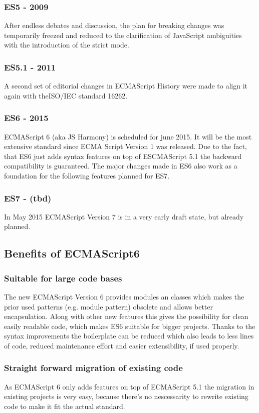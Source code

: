 \documentclass{bioinfo}
\begin{document}
\subsubsection*{\textbf{ES5 - 2009}}
After endless debates and discussion, the plan for breaking changes was temporarily freezed and reduced to the clarification of JavaScript ambiguities with the introduction of the strict mode.
\subsubsection*{\textbf{ES5.1 - 2011}}
A second set of editorial changes in ECMAScript History were made to align it again with theISO/IEC standard 16262.
\subsubsection*{\textbf{ES6 - 2015}}
ECMAScript 6 (aka JS Harmony) is scheduled for june 2015. It will be the most extensive standard since ECMA Script Version 1 was released. Due to the fact, that ES6 just adds syntax features on top of ESCMAScript 5.1 the backward compatibility is guaranteed. The major changes made in ES6 also work as a foundation for the following features planned for ES7.
\subsubsection*{\textbf{ES7 - (tbd)}}
In May 2015 ECMAScript Version 7 is in a very early draft state, but already planned. 

\subsection{Benefits of ECMAScript6}
\subsubsection{Suitable for large code bases}
The new ECMAScript Version 6 provides modules an classes which makes the prior used patterns (e.g. module pattern) obsolete
and allows better encapsulation. Along with other new features this gives the possibility for clean easily readable code, 
which makes ES6 suitable for bigger projects.
Thanks to the syntax improvements the boilerplate can be reduced which also leads to less lines of code,
reduced maintenance effort and easier extensibility, if used properly.
\subsubsection{Straight forward migration of existing code}
As ECMAScript 6 only adds features on top of ECMAScript 5.1 the migration in existing projects is very easy,
because there's no nescessarity to rewrite existing code to make it fit the actual standard.  
\end{document}
